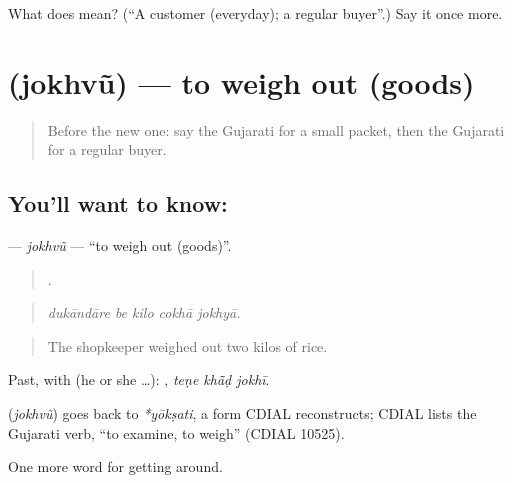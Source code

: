 \begin{tcolorbox}[breakable,colback=teal!4,colframe=teal!35!black,title={Before you move on}]
What does  mean? (\textquotedblleft{}A customer (everyday); a regular buyer\textquotedblright{}.) Say it once more.
\end{tcolorbox}
\section[\texorpdfstring{\gu{જોખવું} (jokhvũ)}{જોખવું (jokhvũ)}]{ (jokhvũ) — to weigh out (goods)}

\label{lesson:GU-C430-jokhvu}



\begin{quote}
Before the new one: say the Gujarati for a small packet, then the Gujarati for a regular buyer.
\end{quote}

\subsection*{You'll want to know: }
\textbf{} — \emph{jokhvũ} — \textquotedblleft{}to weigh out (goods)\textquotedblright{}.

\begin{quote}
    .
\end{quote}

\begin{quote}
\emph{dukāndāre be kilo cokhā jokhyā.}
\end{quote}

\begin{quote}
The shopkeeper weighed out two kilos of rice.
\end{quote}

Past, with  (he or she …):   , \emph{teṇe khā̃ḍ jokhī}.

\begin{cousinweb}
\textbf{} (\emph{jokhvũ}) goes back to \emph{*yōkṣati}, a form CDIAL reconstructs; CDIAL lists the Gujarati verb, \textquotedblleft{}to examine, to weigh\textquotedblright{} (CDIAL 10525).
\end{cousinweb}

\begin{grammarlens}[title={What you've built}]
One more word for getting around.
\end{grammarlens}

